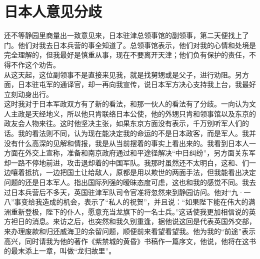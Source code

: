 \fancyhead[RO]{} %
\fancyhead[LE]{} %
\chapter*{日本人意见分歧}
\thispagestyle{empty}
还不等静园里商量出一致意见来，日本驻津总领事馆的副领事，第二天便找上了门。他们对我去日本兵营的事全知道了。总领事馆表示，他们对我的心情和处境是完全理解的，但我最好是慎重从事，现在不要离开天津；他们负有保护的责任，不得不作这个劝告。\\

从这天起，这位副领事不是直接来见我，就是找舅甥或是父子，进行劝阻。另方面，日本驻屯军的通译官，却一再向我宣传，说日本军方决心支持我上台，我最好立刻动身出行。\\

这时我对于日本军政双方有了新的看法，和那一伙人的看法有了分歧。一向认为文人主政是天经地义，所以他只肯联络日本公使，他的外甥只肯和领事馆以及东京的政友会人物来往。这时他坚决主张，如果东京方面没有表示，千万别听军人们的话。我的看法则不同，认为现在能决定我的命运的不是日本政客，而是军人。我并没有什么高深的见解和情报，我是从当前摆着的事实上看出来的。我看到日本人一方面在外交上宣称，准备和南京政府通过和平途径解决“中日纠纷”，另方面关东军却一路不停地前进，攻击退却着的中国军队。我那时虽然还不太明白，这和、们一边嚷着抵抗，一边把国土让给敌人，原都是用以欺世的两面手法，但我能看出决定问题的还是日本军人。指出国际列强的暧昧态度可虑，这也和我的感觉不同。我去过日本兵营后不多天，英国驻津军队司令官准将忽然来到静园访问。他对“九·一八”事变给我造成的机会，表示了“私人的祝贺”，并且说：“如果陛下能在伟大的满洲重新登极，陛下的仆人，愿意充当龙旗下的一名士兵。”这话使我更加相信说的英方袒日的消息。来访之后，也突然和我久别重逢，据他说这回是代表英国外交部，来办理废款和归还威海卫的余留问题，顺便前来看望看望我。他为我的“前途”表示高兴，同时请我为他的著作《紫禁城的黄昏》书稿作一篇序文，他说，他将在这书的最末添上一章，叫做“龙归故里”。\\

